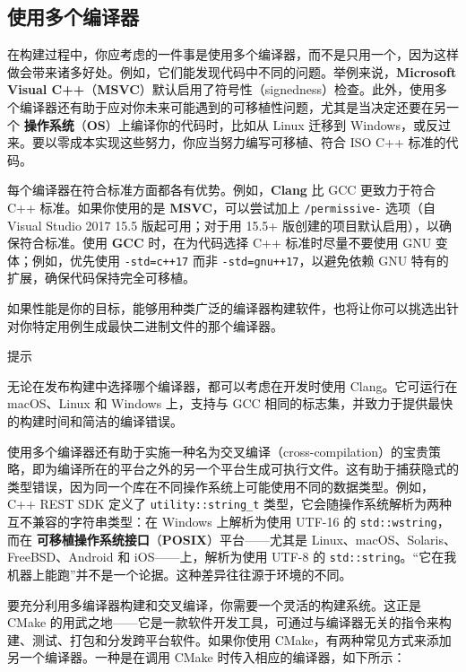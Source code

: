 \subsection{使用多个编译器}

\label{idx:634}
\label{idx:635}
在构建过程中，你应考虑的一件事是使用多个编译器，而不是只用一个，因为这样做会带来诸多好处。例如，它们能发现代码中不同的问题。举例来说，\textbf{Microsoft Visual C++}（\textbf{MSVC}）默认启用了符号性（signedness）检查。此外，使用多个编译器还有助于应对你未来可能遇到的可移植性问题，尤其是当决定还要在另一个 \textbf{操作系统}（\textbf{OS}）上编译你的代码时，比如从 Linux 迁移到 Windows，或反过来。要以零成本实现这些努力，你应当努力编写可移植、符合 ISO C++ 标准的代码。

\label{idx:636}
每个编译器在符合标准方面都各有优势。例如，\textbf{Clang} 比 GCC 更致力于符合 C++ 标准。如果你使用的是 \textbf{MSVC}，可以尝试加上 \texttt{/\allowbreak{}permissive-} 选项（自 Visual Studio 2017 15.5 版起可用；对于用 15.5+ 版创建的项目默认启用），以确保符合标准。使用 \textbf{GCC} 时，在为代码选择 C++ 标准时尽量不要使用 GNU 变体；例如，优先使用 \texttt{-std=\allowbreak{}c+\allowbreak{}+\allowbreak{}17} 而非 \texttt{-std=\allowbreak{}gnu+\allowbreak{}+\allowbreak{}17}，以避免依赖 GNU 特有的扩展，确保代码保持完全可移植。

如果性能是你的目标，能够用种类广泛的编译器构建软件，也将让你可以挑选出针对你特定用例生成最快二进制文件的那个编译器。

\begin{myTip}{提示}

无论在发布构建中选择哪个编译器，都可以考虑在开发时使用 Clang。它可运行在 macOS、Linux 和 Windows 上，支持与 GCC 相同的标志集，并致力于提供最快的构建时间和简洁的编译错误。
\end{myTip}

\label{idx:637}
使用多个编译器还有助于实施一种名为交叉编译（cross-compilation）的宝贵策略，即为编译所在的平台之外的另一个平台生成可执行文件。这有助于捕获隐式的类型错误，因为同一个库在不同操作系统上可能使用不同的数据类型。例如，C++ REST SDK 定义了 \texttt{utility::\allowbreak{}string\_\allowbreak{}t} 类型，它会随操作系统解析为两种互不兼容的字符串类型：在 Windows 上解析为使用 UTF-16 的 \texttt{std::\allowbreak{}wstring}，而在 \textbf{可移植操作系统接口}（\textbf{POSIX}）平台——尤其是 Linux、macOS、Solaris、FreeBSD、Android 和 iOS——上，解析为使用 UTF-8 的 \texttt{std::\allowbreak{}string}。“它在我机器上能跑”并不是一个论据。这种差异往往源于环境的不同。

要充分利用多编译器构建和交叉编译，你需要一个灵活的构建系统。这正是 CMake 的用武之地——它是一款软件开发工具，可通过与编译器无关的指令来构建、测试、打包和分发跨平台软件。如果你使用 CMake，有两种常见方式来添加另一个编译器。一种是在调用 CMake 时传入相应的编译器，如下所示：

